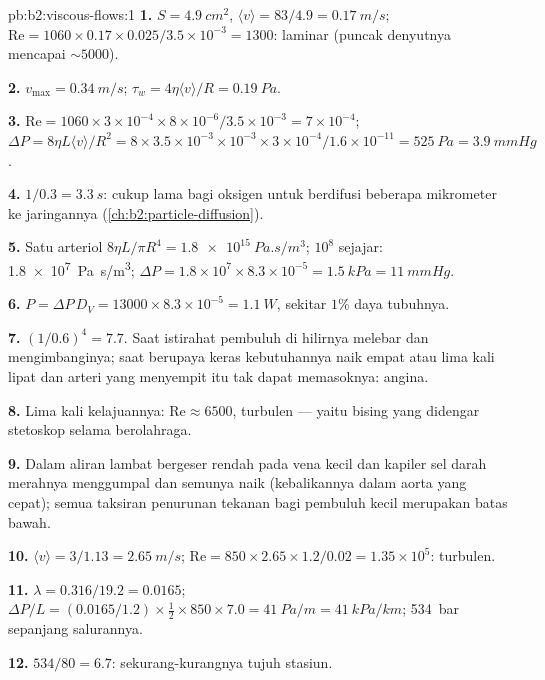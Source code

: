 \begin{solution}{pb:b2:viscous-flows:1}
\textbf{1.} $S = \qty{4.9}{cm^2}$, $\langle v\rangle = 83/4.9 = \qty{0.17}{m/s}$; $\mathrm{Re}
= 1060 \times 0.17 \times 0.025/3.5 \times 10^{-3} = 1300$: laminar (puncak denyutnya
mencapai $\sim 5000$).

\textbf{2.} $v_{\max} = \qty{0.34}{m/s}$; $\tau_w = 4\eta\langle v\rangle/R = \qty{0.19}{Pa}$.

\textbf{3.} $\mathrm{Re} = 1060 \times 3 \times 10^{-4} \times 8 \times 10^{-6}/3.5 \times 10^{-3} =
7 \times 10^{-4}$; $\Delta P = 8\eta L\langle v\rangle/R^2 = 8 \times 3.5 \times 10^{-3} \times 10^{-3}
\times 3 \times 10^{-4}/1.6 \times 10^{-11} = \qty{525}{Pa} = \qty{3.9}{mmHg}$.

\textbf{4.} $1/0.3 = \qty{3.3}{s}$: cukup lama bagi oksigen untuk berdifusi beberapa
mikrometer ke jaringannya (\cref{ch:b2:particle-diffusion}).

\textbf{5.} Satu arteriol $8\eta L/\pi R^4 = \qty{1.8e15}{Pa.s/m^3}$; $10^8$
sejajar: \qty{1.8e7}{Pa.s/m^3}; $\Delta P = 1.8 \times 10^7 \times 8.3 \times 10^{-5} =
\qty{1.5}{kPa} = \qty{11}{mmHg}$.

\textbf{6.} $P = \Delta P\,D_V = 13000 \times 8.3 \times 10^{-5} = \qty{1.1}{W}$, sekitar
$1\%$ daya tubuhnya.

\textbf{7.} $(1/0.6)^4 = 7.7$. Saat istirahat pembuluh di hilirnya melebar dan
mengimbanginya; saat berupaya keras kebutuhannya naik empat atau lima kali lipat dan
arteri yang menyempit itu tak dapat memasoknya: angina.

\textbf{8.} Lima kali kelajuannya: $\mathrm{Re} \approx 6500$, turbulen --- yaitu
bising yang didengar stetoskop selama berolahraga.

\textbf{9.} Dalam aliran lambat bergeser rendah pada vena kecil dan kapiler
sel darah merahnya menggumpal dan  semunya naik (kebalikannya
dalam aorta yang cepat); semua taksiran penurunan tekanan bagi pembuluh kecil
merupakan batas bawah.

\textbf{10.} $\langle v\rangle = 3/1.13 = \qty{2.65}{m/s}$; $\mathrm{Re} = 850 \times 2.65 \times
1.2/0.02 = 1.35 \times 10^5$: turbulen.

\textbf{11.} $\lambda = 0.316/19.2 = 0.0165$; $\Delta P/L = (0.0165/1.2) \times \tfrac12 \times
850 \times 7.0 = \qty{41}{Pa/m} = \qty{41}{kPa/km}$; \qty{534}{bar} sepanjang salurannya.

\textbf{12.} $534/80 = 6.7$: sekurang-kurangnya tujuh stasiun.


\end{solution}
